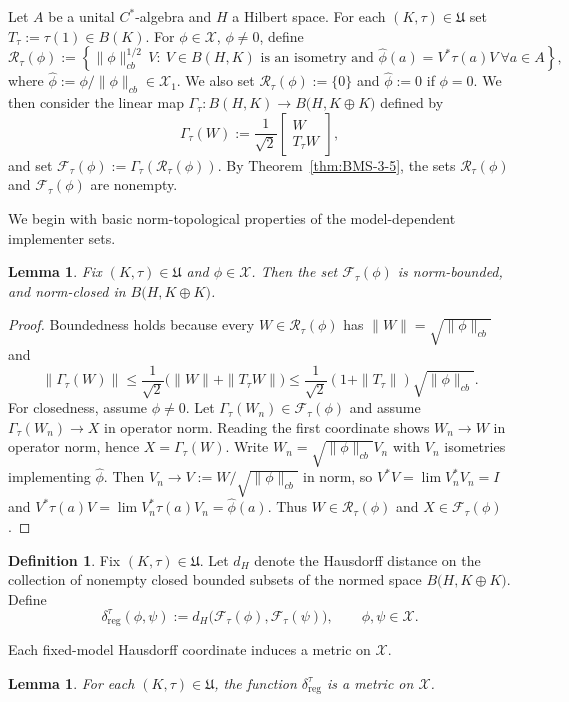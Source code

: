 \documentclass[11pt]{amsart}
\newtheorem{lemma}[theorem]{Lemma}
\theoremstyle{definition}
\newtheorem{definition}[theorem]{Definition}
\theoremstyle{remark}
\newcommand{\1}{\mathbbm{1}}
\begin{document}
Let $A$ be a unital $C^*$-algebra and $H$ a Hilbert space. For each $(K,\tau)\in\mathfrak U$ set $T_\tau:=\tau(1)\in B(K)$. For $\phi\in \mathcal X$, $\phi\neq 0$, define
\[
\mathscr R_\tau(\phi):=
\left\{\|\phi\|_{cb}^{1/2}\,V:\ V\in B(H,K)\text{ is an isometry and }
\widehat \phi(a)=V^*\tau(a)V\ \forall a\in A\right\},\] where $\widehat{\phi}:=\phi/\|\phi\|_{cb} \in  \mathcal X_1$. We also set $\mathscr R_\tau(\phi):=\{0\}$ and $\widehat{\phi}:=0$ if $\phi=0$. We then consider the linear map $\Gamma_\tau:B(H,K)\to B\bigl(H,K\oplus K\bigr)$ defined by
\[
\Gamma_\tau(W):=\frac1{\sqrt2}\begin{bmatrix}W\\ T_\tau W\end{bmatrix},
\] and set $\mathscr F_\tau(\phi):=\Gamma_\tau(\mathscr R_\tau(\phi))$. By Theorem~\ref{thm:BMS-3-5}, the sets $\mathscr R_\tau(\phi)$ and $\mathscr F_\tau(\phi)$ are nonempty.

We begin with basic norm-topological properties of the model-dependent implementer sets.
\begin{lemma}\label{lem:closed-bounded-tau}
Fix $(K,\tau)\in\mathfrak U$ and $\phi\in \mathcal X$. Then the set $\mathscr F_\tau(\phi)$ is norm-bounded, and norm-closed in
$B\bigl(H,K\oplus K\bigr)$.
\end{lemma}

\begin{proof}
Boundedness holds because every $W\in\mathscr R_\tau(\phi)$ has $\|W\|=\sqrt{\|\phi\|_{cb}}$ and
\[
\|\Gamma_\tau(W)\|\le \frac1{\sqrt2}\bigl(\|W\|+\|T_\tau W\|\bigr)\le \frac1{\sqrt2}(1+\|T_\tau\|)\sqrt{\|\phi\|_{cb}}.
\]
For closedness,
assume $\phi\neq 0$.
Let $\Gamma_\tau(W_n)\in\mathscr F_\tau(\phi)$ and assume $\Gamma_\tau(W_n)\to X$ in operator norm.
Reading the first coordinate shows $W_n\to W$ in operator norm, hence $X=\Gamma_\tau(W)$.
Write $W_n=\sqrt{\|\phi\|_{cb}}V_n$ with $V_n$ isometries implementing $\widehat\phi$.
Then $V_n\to V:=W/\sqrt{\|\phi\|_{cb}}$ in norm, so $V^*V=\lim V_n^*V_n=I$ and
$V^*\tau(a)V=\lim V_n^*\tau(a)V_n=\widehat\phi(a)$. Thus $W\in \mathscr R_\tau(\phi)$ and $X\in\mathscr F_\tau(\phi)$.
\end{proof}

\begin{definition}
\label{def:delta-reg-tau}
Fix $(K,\tau)\in\mathfrak U$.
Let $d_H$ denote the Hausdorff distance on the collection of nonempty closed bounded subsets of
the normed space $B\bigl(H,K\oplus K\bigr)$.
Define
\[
\delta_{\mathrm{reg}}^{\tau}(\phi,\psi):=d_H\bigl(\mathscr F_\tau(\phi),\mathscr F_\tau(\psi)\bigr),
\qquad \phi,\psi\in \mathcal X.
\]
\end{definition}
Each fixed-model Hausdorff coordinate induces a metric on $\mathcal X$.
\begin{lemma}
\label{lem:delta-reg-tau-metric}
For each $(K,\tau)\in\mathfrak U$, the function $\delta_{\mathrm{reg}}^{\tau}$ is a metric on $\mathcal X$.
\end{lemma}
\end{document}
